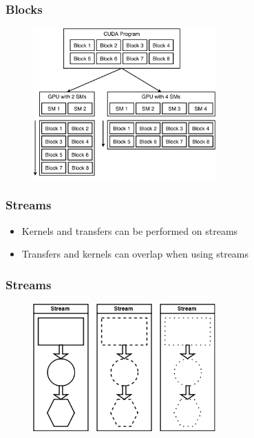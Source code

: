 \documentclass{beamer}
\begin{document}
\begin{frame}
\frametitle{Blocks}

\begin{figure}[h]
    \centering
    \includegraphics[width=7cm]{../grid_scale.png}
\end{figure}

\end{frame}

\begin{frame}
\frametitle{Streams}

\begin{itemize}
 \item Kernels and transfers can be performed on streams
 \item Transfers and kernels can overlap when using streams
\end{itemize}

\end{frame}

\begin{frame}
\frametitle{Streams}

\begin{figure}[h]
    \centering
    \includegraphics[width=7cm]{../StreamsQueue.png}
\end{figure}

\end{frame}
\end{document}
